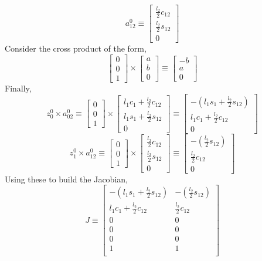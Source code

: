 \documentclass[12pt]{article}
\begin{document}
\[
  a_{12}^0 \equiv
  \begin{bmatrix}
    \frac{l_2}{2}c_{12}\\
    \frac{l_2}{2}s_{12}\\
    0
  \end{bmatrix}
\]
Consider the cross product of the form,
\[
  \begin{bmatrix} 0 \\ 0 \\ 1 \end{bmatrix} \times \begin{bmatrix} a \\ b \\ 0 \end{bmatrix}
  \equiv
  \begin{bmatrix} -b \\ a \\ 0 \end{bmatrix}
\]
Finally,
\[
  z_0^0 \times a_{02}^0 \equiv
  \begin{bmatrix} 0 \\ 0 \\ 1 \end{bmatrix} \times
  \begin{bmatrix}
    l_1c_1 + \frac{l_2}{2}c_{12}\\
    l_1s_1 + \frac{l_2}{2}s_{12}\\
    0
  \end{bmatrix}
  \equiv
  \begin{bmatrix}
    -(l_1s_1 + \frac{l_2}{2}s_{12})\\
    l_1c_1 + \frac{l_2}{2}c_{12}\\
    0
  \end{bmatrix}
\]
\[
  z_1^0 \times a_{12}^0 \equiv
  \begin{bmatrix} 0 \\ 0 \\ 1 \end{bmatrix} \times
  \begin{bmatrix}
    \frac{l_2}{2}c_{12}\\
    \frac{l_2}{2}s_{12}\\
    0
  \end{bmatrix}
  \equiv
  \begin{bmatrix}
    -(\frac{l_2}{2}s_{12})\\
    \frac{l_2}{2}c_{12}\\
    0
  \end{bmatrix}
\]
Using these to build the Jacobian,
\[
  J \equiv
  \begin{bmatrix}
    -(l_1s_1 + \frac{l_2}{2}s_{12}) & -(\frac{l_2}{2}s_{12})\\
    l_1c_1 + \frac{l_2}{2}c_{12} & \frac{l_2}{2}c_{12}\\
    0 & 0 \\
    0 & 0 \\
    0 & 0 \\
    1 & 1 \\
  \end{bmatrix}
\]
\end{document}
